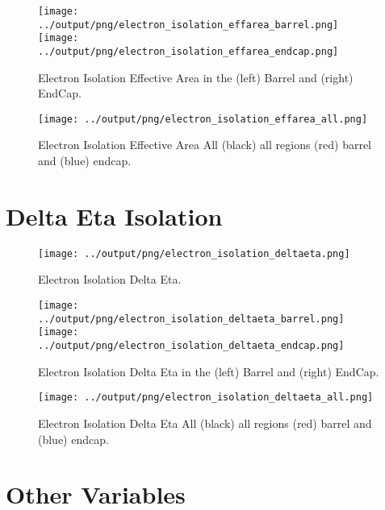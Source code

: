 \documentclass[11pt]{book}
\begin{document}
\begin{figure}[ht]
\centering
\texttt{[image: ../output/png/electron\_isolation\_effarea\_barrel.png]}
\texttt{[image: ../output/png/electron\_isolation\_effarea\_endcap.png]}
\caption{Electron Isolation Effective Area in the (left) Barrel and (right) EndCap.}
\label{fig:electron_isolation_effarea_regions}
\end{figure}

\begin{figure}[ht]
\centering
\texttt{[image: ../output/png/electron\_isolation\_effarea\_all.png]}
\caption{Electron Isolation Effective Area All (black) all regions (red) barrel and (blue) endcap.}
\label{fig:electron_isolation_effarea_all}
\end{figure}

\clearpage

\section{Delta Eta Isolation}

\begin{figure}[ht]
\centering
\texttt{[image: ../output/png/electron\_isolation\_deltaeta.png]}
\caption{Electron Isolation Delta Eta.}
\label{fig:electron_isolation_deltaeta}
\end{figure}

\begin{figure}[ht]
\centering
\texttt{[image: ../output/png/electron\_isolation\_deltaeta\_barrel.png]}
\texttt{[image: ../output/png/electron\_isolation\_deltaeta\_endcap.png]}
\caption{Electron Isolation Delta Eta in the (left) Barrel and (right) EndCap.}
\label{fig:electron_isolation_deltaeta_regions}
\end{figure}

\begin{figure}[ht]
\centering
\texttt{[image: ../output/png/electron\_isolation\_deltaeta\_all.png]}
\caption{Electron Isolation Delta Eta All (black) all regions (red) barrel and (blue) endcap.}
\label{fig:electron_isolation_deltaeta_all}
\end{figure}

\clearpage

\section{Other Variables}
\end{document}
